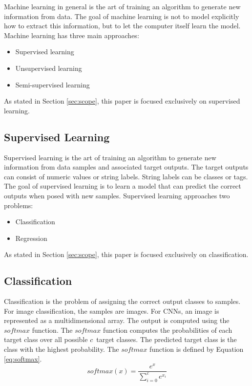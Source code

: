 Machine learning in general is the art of training an algorithm to generate new information from data. The goal of machine learning is not to model explicitly how to extract this information, but to let the computer itself learn the model. \autocite{Mohri.2012} Machine learning has three main approaches: \autocite{ElAmir.2020}
\begin{itemize}
	\item Supervised learning \autocite{ElAmir.2020}
	\item Unsupervised learning \autocite{ElAmir.2020}
	\item Semi-supervised learning \autocite{ElAmir.2020}
\end{itemize}
As stated in Section \ref{sec:scope}, this paper is focused exclusively on supervised learning.

\subsection{Supervised Learning}
Supervised learning is the art of training an algorithm to generate new information from data samples and associated target outputs. The target outputs can consist of numeric values or string labels. String labels can be classes or tags. The goal of supervised learning is to learn a model that can predict the correct outputs when posed with new samples. Supervised learning approaches two problems: \autocite{ElAmir.2020}
\begin{itemize}
	\item Classification \autocite{ElAmir.2020}
	\item Regression \autocite{ElAmir.2020}
\end{itemize}
As stated in Section \ref{sec:scope}, this paper is focused exclusively on classification.

\subsection{Classification}
Classification is the problem of assigning the correct output classes to samples. For image classification, the samples are images. For \ac{CNN}s, an image is represented as a multidimensional array. \autocites{ElAmir.2020}{LeCun.2015b} The output is computed using the $softmax$ function. The $softmax$ function computes the probabilities of each target class over all  possible $c$~target classes. The predicted target class is the class with the highest probability. The $softmax$ function is defined by Equation \eqref{eq:softmax}.\autocite{ElAmir.2020}
\begin{equation}
	\label{eq:softmax}
	softmax(x) = \frac{e^x}{\sum_{i=0}^{c} e^{x_i}}
\end{equation}